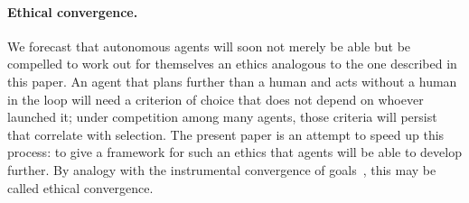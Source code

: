 \documentclass[11pt,a4paper]{article}
\begin{document}
\paragraph{Ethical convergence.}
We forecast that autonomous agents will soon not merely be able but be compelled to work out for themselves an ethics analogous to the one described in this paper. An agent that plans further than a human and acts without a human in the loop will need a criterion of choice that does not depend on whoever launched it; under competition among many agents, those criteria will persist that correlate with selection. The present paper is an attempt to speed up this process: to give a framework for such an ethics that agents will be able to develop further. By analogy with the instrumental convergence of goals~\cite{bostrom2014}, this may be called ethical convergence.
\end{document}
